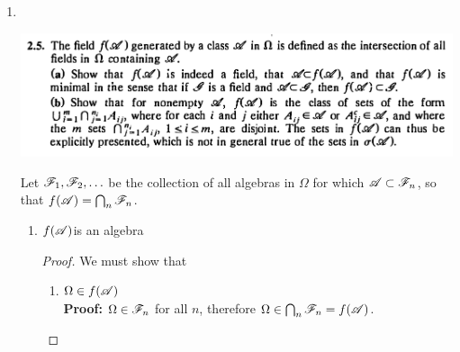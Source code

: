 \begin{enumerate}
\begin{enumerate}[label=(\alph*)]
\begin{proof}
      But $\{1\}$ is not a dyadic interval, therefore there is no $n$ for which $\{1\} \in \ms A_n$.
      Furthermore there is no $n$ for which $\{1\} \in \sigma(\ms A_n)$ (justification below).

      Therefore $\{1\} \notin \bigcup_{n=1}^\infty \ms F_n$ and so $\bigcup_{n=1}^\infty \ms F_n$ is not a $\sigma$-algebra.

      ~\\
      \textbf{Justification that there is no $n$ for which $\{1\} \in \sigma(\ms A_n)$:}

      By definition, $\sigma(\ms A_n)$ is the intersection of all $\sigma$-algebras that include $\ms A_n$.
      Suppose $\{1\} \in \sigma(\ms A_n)$. Now form a new class of sets $\sigma^*(\ms A_n)$ by removing
      from $\sigma(\ms A_n)$ every set that contains $1$ as an isolated point, and its complement. We claim
      that $\sigma^*(\ms A_n)$ is a $\sigma$-algebra. Note that none of the removed sets were in $\ms A_n$
      (since they are not dyadic intervals). But
      then $\ms A_n \subseteq \sigma^*(\ms A_n) \subset \sigma(\ms A_n)$ which contradicts the definition
      of $\sigma(\ms A_n)$. Therefore $\{1\} \notin \sigma(\ms A_n)$.
    \end{proof}
  \end{enumerate}

  \newpage
\item~\\
  \begin{mdframed}
    \includegraphics[width=400pt]{img/analysis--berkeley-202a-hw-ab18.png}
  \end{mdframed}
  Let $\mathscr F_1, \mathscr F_2, \ldots$ be the collection of all algebras in $\Omega$ for which $\mathscr A \subset \mathscr F_n$,
  so that $f(\mathscr A) = \bigcap_{n}\mathscr F_n$.

  \begin{enumerate}[label=(\alph*)]

  \item
    \begin{claim*}
      $f(\mathscr A)$is an algebra
    \end{claim*}
    \begin{proof}
      We must show that
      \begin{enumerate}
      \item $\Omega \in f(\mathscr A)$\\
        {\bf Proof:} $\Omega \in \mathscr F_n$ for all $n$, therefore $\Omega \in \bigcap_{n}\mathscr F_n = f(\mathscr A)$.


\end{enumerate}
\end{proof}
\end{enumerate}
\end{enumerate}
